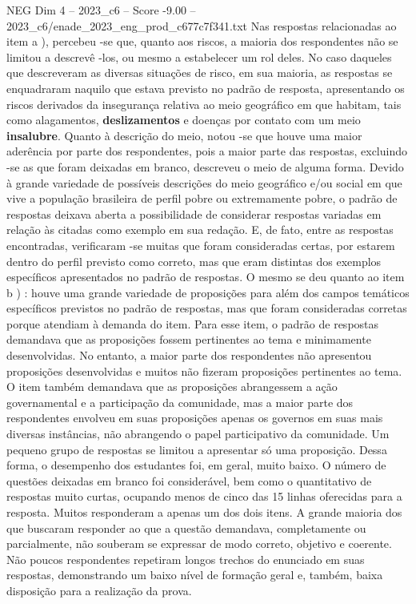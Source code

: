 \begin{textsample}{NEG Dim 4 – 2023\_c6 – Score -9.00 – 2023\_c6/enade\_2023\_eng\_prod\_c677c7f341.txt}
Nas respostas relacionadas ao item a ), percebeu -se que, quanto aos riscos, a maioria dos respondentes não se limitou a descrevê -los, ou mesmo a estabelecer um rol deles.
No caso daqueles que descreveram as diversas situações de risco, em sua maioria, as respostas se enquadraram naquilo que estava previsto no padrão de resposta, apresentando os riscos derivados da insegurança relativa ao meio geográfico em que habitam, tais como alagamentos, \textbf{deslizamentos} e doenças por contato com um meio \textbf{insalubre}.
Quanto à descrição do meio, notou -se que houve uma maior aderência por parte dos respondentes, pois a maior parte das respostas, excluindo -se as que foram deixadas em branco, descreveu o meio de alguma forma.
Devido à grande variedade de possíveis descrições do meio geográfico e/ou social em que vive a população brasileira de perfil pobre ou extremamente pobre, o padrão de respostas deixava aberta a possibilidade de considerar respostas variadas em relação às citadas como exemplo em sua redação.
E, de fato, entre as respostas encontradas, verificaram -se muitas que foram consideradas certas, por estarem dentro do perfil previsto como correto, mas que eram distintas dos exemplos específicos apresentados no padrão de respostas.
O mesmo se deu quanto ao item b ) : houve uma grande variedade de proposições para além dos campos temáticos específicos previstos no padrão de respostas, mas que foram consideradas corretas porque atendiam à demanda do item.
Para esse item, o padrão de respostas demandava que as proposições fossem pertinentes ao tema e minimamente desenvolvidas.
No entanto, a maior parte dos respondentes não apresentou proposições desenvolvidas e muitos não fizeram proposições pertinentes ao tema.
O item também demandava que as proposições abrangessem a ação governamental e a participação da comunidade, mas a maior parte dos respondentes envolveu em suas proposições apenas os governos em suas mais diversas instâncias, não abrangendo o papel participativo da comunidade.
Um pequeno grupo de respostas se limitou a apresentar só uma proposição.
Dessa forma, o desempenho dos estudantes foi, em geral, muito baixo.
O número de questões deixadas em branco foi considerável, bem como o quantitativo de respostas muito curtas, ocupando menos de cinco das 15 linhas oferecidas para a resposta.
Muitos responderam a apenas um dos dois itens.
A grande maioria dos que buscaram responder ao que a questão demandava, completamente ou parcialmente, não souberam se expressar de modo correto, objetivo e coerente.
Não poucos respondentes repetiram longos trechos do enunciado em suas respostas, demonstrando um baixo nível de formação geral e, também, baixa disposição para a realização da prova.

\end{textsample}
